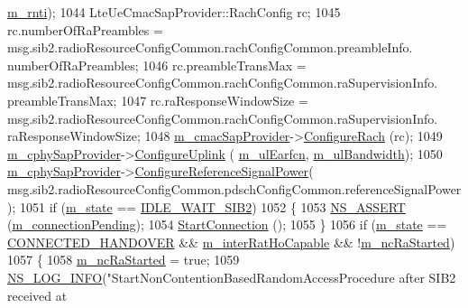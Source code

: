\begin{DoxyCode}
      \hyperlink{classns3_1_1LteUeRrc_a8e078d8ef0ad23e670fe2ef08caab84f}{m\_rnti});
1044           LteUeCmacSapProvider::RachConfig rc;
1045           rc.numberOfRaPreambles = msg.sib2.radioResourceConfigCommon.rachConfigCommon.preambleInfo.
      numberOfRaPreambles;
1046           rc.preambleTransMax = msg.sib2.radioResourceConfigCommon.rachConfigCommon.raSupervisionInfo.
      preambleTransMax;
1047           rc.raResponseWindowSize = msg.sib2.radioResourceConfigCommon.rachConfigCommon.raSupervisionInfo.
      raResponseWindowSize;
1048           \hyperlink{classns3_1_1LteUeRrc_a5a7bffd2040d73eb5db1aaef849d0396}{m\_cmacSapProvider}->\hyperlink{classns3_1_1LteUeCmacSapProvider_a91b4dbb51b9c382dfe0a763da75d9f09}{ConfigureRach} (rc);
1049           \hyperlink{classns3_1_1LteUeRrc_a0441858e31f56c75678afa92b7c7193d}{m\_cphySapProvider}->\hyperlink{classns3_1_1LteUeCphySapProvider_aa24d42854142c74d40a9a334c9e6884b}{ConfigureUplink} (
      \hyperlink{classns3_1_1LteUeRrc_a6ff890b601bbc956914219d51adef66f}{m\_ulEarfcn}, \hyperlink{classns3_1_1LteUeRrc_a6ae2139e198c3ae86b03d2564a4e8c2a}{m\_ulBandwidth});
1050           \hyperlink{classns3_1_1LteUeRrc_a0441858e31f56c75678afa92b7c7193d}{m\_cphySapProvider}->\hyperlink{classns3_1_1LteUeCphySapProvider_a6faf0aa83db9a368f85655fb61637c25}{ConfigureReferenceSignalPower}(
      msg.sib2.radioResourceConfigCommon.pdschConfigCommon.referenceSignalPower);
1051           \textcolor{keywordflow}{if} (\hyperlink{classns3_1_1LteUeRrc_a81d711739d758a5add38b100086be632}{m\_state} == \hyperlink{classns3_1_1LteUeRrc_a241012c291e75681150c9214e11f6145a36c5c3cd2646a4deb69ee806fa0ce8d3}{IDLE\_WAIT\_SIB2})
1052             \{
1053               \hyperlink{assert_8h_a6dccdb0de9b252f60088ce281c49d052}{NS\_ASSERT} (\hyperlink{classns3_1_1LteUeRrc_a0239d01e0235114cd7cdda22aff175ac}{m\_connectionPending});
1054               \hyperlink{classns3_1_1LteUeRrc_ac4257b9ffbca42aba710a3f66a719785}{StartConnection} ();
1055             \}
1056           \textcolor{keywordflow}{if} (\hyperlink{classns3_1_1LteUeRrc_a81d711739d758a5add38b100086be632}{m\_state} == \hyperlink{classns3_1_1LteUeRrc_a241012c291e75681150c9214e11f6145a619fb36d614e3e051f981aa3d43a633c}{CONNECTED\_HANDOVER} && 
      \hyperlink{classns3_1_1LteUeRrc_a0702e1a453de2d8f1c454fea344ef4f0}{m\_interRatHoCapable} && !\hyperlink{classns3_1_1LteUeRrc_a15d55f6ff2b347d2ea0610b66513fbdb}{m\_ncRaStarted})
1057             \{
1058               \hyperlink{classns3_1_1LteUeRrc_a15d55f6ff2b347d2ea0610b66513fbdb}{m\_ncRaStarted} = \textcolor{keyword}{true};
1059               \hyperlink{group__logging_gafbd73ee2cf9f26b319f49086d8e860fb}{NS\_LOG\_INFO}(\textcolor{stringliteral}{"StartNonContentionBasedRandomAccessProcedure after SIB2 received at
}
\end{DoxyCode}
